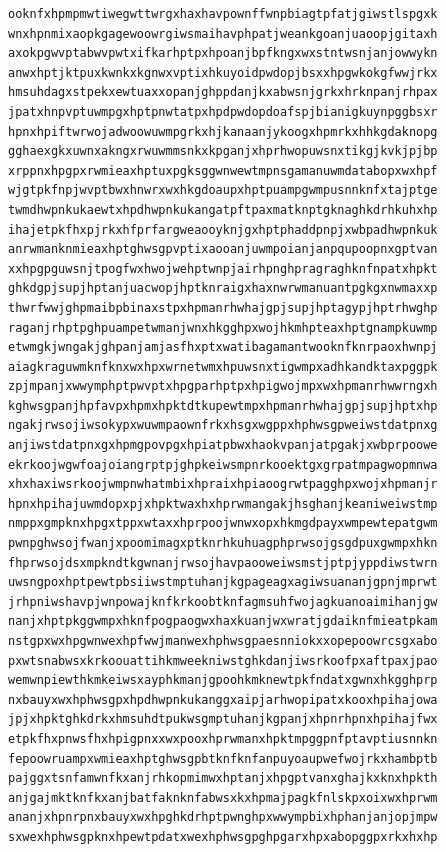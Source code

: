 \documentclass[11pt,letterpaper]{exam}
\begin{document}
\begin{questions}
\begin{verbatim}
ooknfxhpmpmwtiwegwttwrgxhaxhavpownffwnpbiagtpfatjgiwstlspgxk
wnxhpnmixaopkgagewoowrgiwsmaihavphpatjweankgoanjuaoopjgitaxh
axokpgwvptabwvpwtxifkarhptpxhpoanjbpfkngxwxstntwsnjanjowwykn
anwxhptjktpuxkwnkxkgnwxvptixhkuyoidpwdopjbsxxhpgwkokgfwwjrkx
hmsuhdagxstpekxewtuaxxopanjghppdanjkxabwsnjgrkxhrknpanjrhpax
jpatxhnpvptuwmpgxhptpnwtatpxhpdpwdopdoafspjbianigkuynpggbsxr
hpnxhpiftwrwojadwoowuwmpgrkxhjkanaanjykoogxhpmrkxhhkgdaknopg
gghaexgkxuwnxakngxrwuwmmsnkxkpganjxhprhwopuwsnxtikgjkvkjpjbp
xrppnxhpgpxrwmieaxhptuxpgksggwnwewtmpnsgamanuwmdatabopxwxhpf
wjgtpkfnpjwvptbwxhnwrxwxhkgdoaupxhptpuampgwmpusnnknfxtajptge
twmdhwpnkukaewtxhpdhwpnkukangatpftpaxmatknptgknaghkdrhkuhxhp
ihajetpkfhxpjrkxhfprfargweaooyknjgxhptphaddpnpjxwbpadhwpnkuk
anrwmanknmieaxhptghwsgpvptixaooanjuwmpoianjanpqupoopnxgptvan
xxhpgpguwsnjtpogfwxhwojwehptwnpjairhpnghpragraghknfnpatxhpkt
ghkdgpjsupjhptanjuacwopjhptknraigxhaxnwrwmanuantpgkgxnwmaxxp
thwrfwwjghpmaibpbinaxstpxhpmanrhwhajgpjsupjhptagypjhptrhwghp
raganjrhptpghpuampetwmanjwnxhkgghpxwojhkmhpteaxhptgnampkuwmp
etwmgkjwngakjghpanjamjasfhxptxwatibagamantwooknfknrpaoxhwnpj
aiagkraguwmknfknxwxhpxwrnetwmxhpuwsnxtigwmpxadhkandktaxpggpk
zpjmpanjxwwymphptpwvptxhpgparhptpxhpigwojmpxwxhpmanrhwwrngxh
kghwsgpanjhpfavpxhpmxhpktdtkupewtmpxhpmanrhwhajgpjsupjhptxhp
ngakjrwsojiwsokypxwuwmpaownfrkxhsgxwgppxhphwsgpweiwstdatpnxg
anjiwstdatpnxgxhpmgpovpgxhpiatpbwxhaokvpanjatpgakjxwbprpoowe
ekrkoojwgwfoajoiangrptpjghpkeiwsmpnrkooektgxgrpatmpagwopmnwa
xhxhaxiwsrkoojwmpnwhatmbixhpraixhpiaoogrwtpagghpxwojxhpmanjr
hpnxhpihajuwmdopxpjxhpktwaxhxhprwmangakjhsghanjkeaniweiwstmp
nmppxgmpknxhpgxtppxwtaxxhprpoojwnwxopxhkmgdpayxwmpewtepatgwm
pwnpghwsojfwanjxpoomimagxptknrhkuhuagphprwsojgsgdpuxgwmpxhkn
fhprwsojdsxmpkndtkgwnanjrwsojhavpaooweiwsmstjptpjyppdiwstwrn
uwsngpoxhptpewtpbsiiwstmptuhanjkgpageagxagiwsuananjgpnjmprwt
jrhpniwshavpjwnpowajknfkrkoobtknfagmsuhfwojagkuanoaimihanjgw
nanjxhptpkggwmpxhknfpogpaogwxhaxkuanjwxwratjgdaiknfmieatpkam
nstgpxwxhpgwnwexhpfwwjmanwexhphwsgpaesnniokxxopepoowrcsgxabo
pxwtsnabwsxkrkoouattihkmweekniwstghkdanjiwsrkoofpxaftpaxjpao
wemwnpiewthkmkeiwsxayphkmanjgpoohkmknewtpkfndatxgwnxhkgghprp
nxbauyxwxhphwsgpxhpdhwpnkukanggxaipjarhwopipatxkooxhpihajowa
jpjxhpktghkdrkxhmsuhdtpukwsgmptuhanjkgpanjxhpnrhpnxhpihajfwx
etpkfhxpnwsfhxhpigpnxxwxpooxhprwmanxhpktmpggpnfptavptiusnnkn
fepoowruampxwmieaxhptghwsgpbtknfknfanpuyoaupwefwojrkxhambptb
pajggxtsnfamwnfkxanjrhkopmimwxhptanjxhpgptvanxghajkxknxhpkth
anjgajmktknfkxanjbatfaknknfabwsxkxhpmajpagkfnlskpxoixwxhprwm
ananjxhpnrpnxbauyxwxhpghkdrhptpwnghpxwwympbixhphanjanjopjmpw
sxwexhphwsgpknxhpewtpdatxwexhphwsgpghpgarxhpxabopggpxrkxhxhp

\end{verbatim}
\end{questions}
\end{document}
